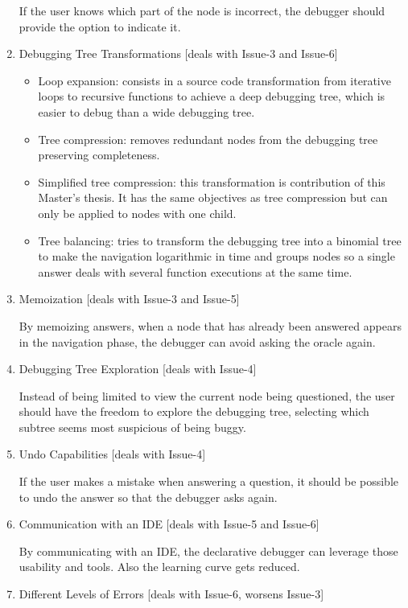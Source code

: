 \begin{enumerate}
If the user knows which part of the node is incorrect, the debugger should provide the option to indicate it.
\item Debugging Tree Transformations [deals with Issue-3 and Issue-6]

\begin{itemize}
    \item Loop expansion: consists in a source code transformation from iterative loops to recursive functions to achieve a deep debugging tree, which is easier to debug than a wide debugging tree.
    \item Tree compression: removes redundant nodes from the debugging tree preserving completeness.
    \item Simplified tree compression: this transformation is contribution of this Master's thesis. It has the same objectives as tree compression but can only be applied to nodes with one child.
    \item Tree balancing: tries to transform the debugging tree into a binomial tree to make the navigation logarithmic in time and groups nodes so a single answer deals with several function executions at the same time.
\end{itemize}

    \item Memoization [deals with Issue-3 and Issue-5]

By memoizing answers, when a node that has already been answered appears in the navigation phase, the debugger can avoid asking the oracle again.
\item Debugging Tree Exploration [deals with Issue-4]

Instead of being limited to view the current node being questioned, the user should have the freedom to explore the debugging tree, selecting which subtree seems most suspicious of being buggy.
\item Undo Capabilities [deals with Issue-4]

If the user makes a mistake when answering a question, it should be possible to undo the answer so that the debugger asks again.
\item Communication with an IDE [deals with Issue-5 and Issue-6]

By communicating with an IDE, the declarative debugger can leverage those usability and tools. Also the learning curve gets reduced.
\item Different Levels of Errors [deals with Issue-6, worsens Issue-3]


\end{enumerate}
